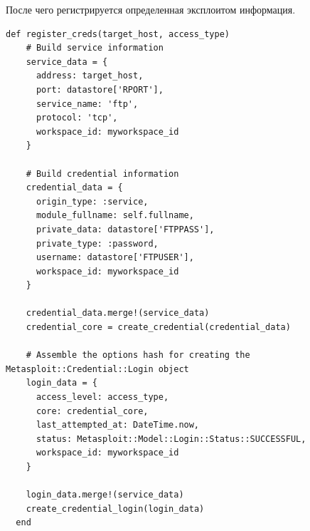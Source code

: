 \documentclass[10pt,a4paper]{report}
\begin{document}
После чего регистрируется определенная эксплоитом информация.
\begin{verbatim}
def register_creds(target_host, access_type)
    # Build service information
    service_data = {
      address: target_host,
      port: datastore['RPORT'],
      service_name: 'ftp',
      protocol: 'tcp',
      workspace_id: myworkspace_id
    }

    # Build credential information
    credential_data = {
      origin_type: :service,
      module_fullname: self.fullname,
      private_data: datastore['FTPPASS'],
      private_type: :password,
      username: datastore['FTPUSER'],
      workspace_id: myworkspace_id
    }

    credential_data.merge!(service_data)
    credential_core = create_credential(credential_data)

    # Assemble the options hash for creating the Metasploit::Credential::Login object
    login_data = {
      access_level: access_type,
      core: credential_core,
      last_attempted_at: DateTime.now,
      status: Metasploit::Model::Login::Status::SUCCESSFUL,
      workspace_id: myworkspace_id
    }

    login_data.merge!(service_data)
    create_credential_login(login_data)
  end
\end{verbatim}
\end{document}
